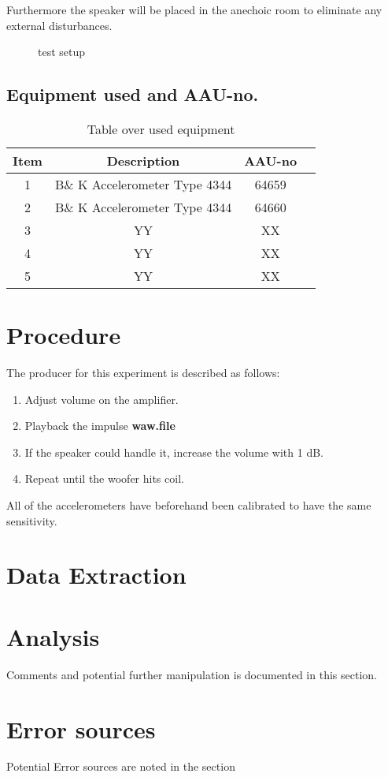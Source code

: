 Furthermore the speaker will be placed in the anechoic room to eliminate any external disturbances.

\begin{figure}[H]
\centering
{}
\caption{test setup}
\label{figure:SpeakertestSetup}
\end{figure}

\subsection*{Equipment used and AAU-no.}

\begin{table}[H]
\centering
{}
\begin{tabular}{S[table-format=1]ccc} \toprule
    {Item} & {Description} & {AAU-no} \\       &  B\& K Accelerometer Type 4344  & 64659   \\ 
    2      &  B\& K Accelerometer Type 4344  & 64660   \\ 
    3      & YY  & XX   \\
    4      & YY  & XX   \\ 
    5      & YY  & XX  \\ \bottomrule 
\end{tabular}
\caption{Table over used equipment}
\end{table}



\section{Procedure}\label{sec:SpeakerTestProcedure}

The producer for this experiment is described as follows:
\begin{enumerate}
\item Adjust volume on the amplifier.
\item Playback the impulse \textbf{waw.file} 
\item If the speaker could handle it, increase the volume with 1 dB.
\item Repeat until the woofer hits coil. 
\end{enumerate}

All of the accelerometers have beforehand been calibrated to have the same sensitivity.

\section{Data Extraction}

\section{Analysis}

Comments and potential further manipulation is documented in this section. 

\section{Error sources}

Potential Error sources are noted in the section

